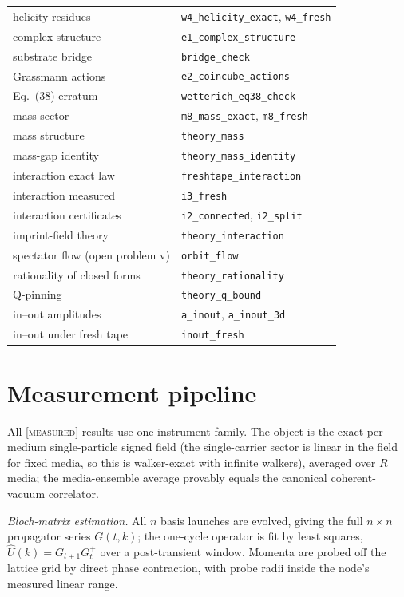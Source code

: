 \documentclass[aps,prd,twocolumn,superscriptaddress,nofootinbib,floatfix]{revtex4-2}
\newcommand{\evX}{\textnormal{\textsc{[measured]}}}
\begin{document}
\begin{table}[!htb]
\begin{ruledtabular}
\begin{tabular}{ll}
helicity residues & \texttt{w4\_helicity\_exact}, \texttt{w4\_fresh}\\
complex structure & \texttt{e1\_complex\_structure}\\
substrate bridge & \texttt{bridge\_check}\\
Grassmann actions & \texttt{e2\_coincube\_actions}\\
Eq.~(38) erratum & \texttt{wetterich\_eq38\_check}\\
mass sector & \texttt{m8\_mass\_exact}, \texttt{m8\_fresh}\\
mass structure & \texttt{theory\_mass}\\
mass-gap identity & \texttt{theory\_mass\_identity}\\
interaction exact law & \texttt{freshtape\_interaction}\\
interaction measured & \texttt{i3\_fresh}\\
interaction certificates & \texttt{i2\_connected}, \texttt{i2\_split}\\
imprint-field theory & \texttt{theory\_interaction}\\
spectator flow (open problem v) & \texttt{orbit\_flow}\\
rationality of closed forms & \texttt{theory\_rationality}\\
Q-pinning & \texttt{theory\_q\_bound}\\
in--out amplitudes & \texttt{a\_inout}, \texttt{a\_inout\_3d}\\
in--out under fresh tape & \texttt{inout\_fresh}
\end{tabular}
\end{ruledtabular}
\end{table}

\section{Measurement pipeline}
\label{app:instrument}

All \evX{} results use one instrument family. The object is the exact
per-medium single-particle signed field (the single-carrier sector is
linear in the field for fixed media, so this is walker-exact with infinite
walkers), averaged over $R$ media; the media-ensemble average provably
equals the canonical coherent-vacuum correlator.

\emph{Bloch-matrix estimation.} All $n$ basis launches are evolved, giving
the full $n\times n$ propagator series $G(t,k)$; the one-cycle operator is
fit by least squares, $\hat U(k)=G_{t+1}G_t^+$ over a post-transient
window. Momenta are probed off the lattice grid by direct phase
contraction, with probe radii inside the node's measured linear range.
\end{document}
